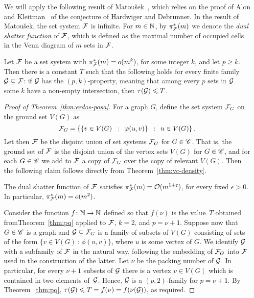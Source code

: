 We will apply the following result of Matou{\v s}ek~\cite{Matousek:2004:BVI:1005787.1005789},
which relies on the proof of Alon and Kleitman~\cite{ALON1992103} of the conjecture of Hardwiger and Debrunner. 
In the result of Matou{\v s}ek, the set system $\cal F$ is infinite. For $m\in \N$, by $\pi_{\cal F}^*(m)$ we denote the \emph{dual shatter function} of $\cal F$, which is defined as the maximal number 
of occupied cells in the Venn diagram of $m$ sets in $\cal F$.


\begin{theorem}\label{thm:pq}
	Let $\cal F$ be a set system with $\pi^*_{\cal F}(m)=o(m^k)$,
	for some integer $k$, and let $p\ge k$.
	Then there is a constant $T$ such that the following holds for every finite family $\cal G\subset \cal F$: 
	if $\cal G$ has the $(p,k)$-property, meaning that 
	among every $p$ sets in $\cal G$ some $k$ have a non-empty intersection, then $\tau ({\cal G})\le T$.
\end{theorem}
\begin{proof}[Proof of Theorem~\ref{thm:erdos-posa}]
For a graph $G$, define the set system ${\cal F}_G$ on the ground set $V(G)$ as
$${\cal F}_G = \setof{\setof{v\in V(G)}{\phi(u, v)}}{u\in V(G)}.$$
Let then $\cal F$ be the disjoint union of set systems ${\cal F}_G$ for $G\in \CCC$. That is, 
the ground set of $\cal F$ is the disjoint union of the vertex sets $V(G)$ for $G\in \CCC$, and for each $G\in \CCC$ we add to ${\cal F}$
a copy of ${\cal F}_G$ over the copy of relevant $V(G)$.
Then the following claim follows directly from Theorem~\ref{thm:vc-density}.

\begin{claim}
The dual shatter function of $\cal F$ satisfies $\pi^*_{\cal F}(m)=\Oof(m^{1+\epsilon})$,
for every fixed $\epsilon>0$. In particular, $\pi^*_{\cal F}(m)=o(m^{2})$.
\end{claim}

Consider the function $f\from \N \to \N$ defined so that $f(\nu)$ is the value~$T$ obtained fromTheorem~\ref{thm:pq} applied to $\cal F$, $k=2$, and $p=\nu+1$.
Suppose now that $G\in \CCC$ is a graph and $\GGG\subseteq \FFF_G$
is a family of subsets of $V(G)$ consisting of sets of the form $\{v\in V(G)\,\colon\,\phi(u,v)\}$, where $u$ is some vertex of $G$.
We identify $\GGG$ with a subfamily of $\FFF$ in the natural way, following the embedding of $\FFF_G$ into $\FFF$ used in the construction of the latter.
Let $\nu$ be the packing number of $\GGG$.
In particular, for every $\nu+1$ subsets of $\GGG$
there is a vertex $v\in V(G)$
which is contained in two elements of~$\GGG$.
Hence, $\GGG$ is a $(p,2)$-family for $p=\nu+1$.
By Theorem~\ref{thm:pq}, $\tau(\GGG)\le T=f(\nu)=f(\nu(\GGG))$, as required.
\end{proof}
